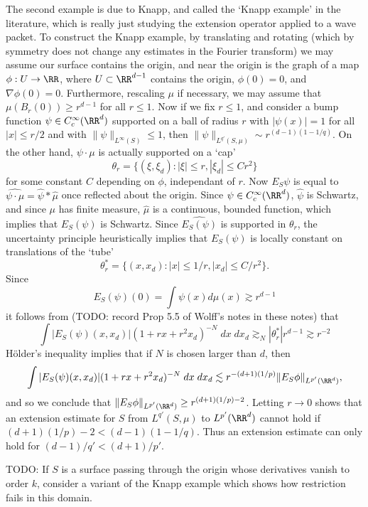 The second example is due to Knapp, and called the `Knapp example' in the literature, which is really just studying the extension operator applied to a wave packet. To construct the Knapp example, by translating and rotating (which by symmetry does not change any estimates in the Fourier transform) we may assume our surface contains the origin, and near the origin is the graph of a map $\phi: U \to \RR$, where $U \subset \RR^{d-1}$ contains the origin, $\phi(0) = 0$, and $\nabla \phi(0) = 0$. Furthermore, rescaling $\mu$ if necessary, we may assume that $\mu(B_r(0)) \geq r^{d-1}$ for all $r \leq 1$. Now if we fix $r \leq 1$, and consider a bump function $\psi \in C_c^\infty(\RR^d)$ supported on a ball of radius $r$ with $|\psi(x)| = 1$ for all $|x| \leq r/2$ and with $\| \psi \|_{L^\infty(S)} \leq 1$, then $\| \psi \|_{L^{q'}(S,\mu)} \sim r^{(d-1)(1 - 1/q)}$. On the other hand, $\psi \cdot \mu$ is actually supported on a `cap'
%
\[ \theta_r = \{ (\xi,\xi_d): |\xi| \leq r, |\xi_d| \leq C r^2 \} \]
%
for some constant $C$ depending on $\phi$, independant of $r$. Now $E_S \psi$ is equal to $\widehat{\psi \cdot \mu} = \widehat{\psi} * \widehat{\mu}$ once reflected about the origin. Since $\psi \in C_c^\infty(\RR^d)$, $\widehat{\psi}$ is Schwartz, and since $\mu$ has finite measure, $\widehat{\mu}$ is a continuous, bounded function, which implies that $E_S(\psi)$ is Schwartz. Since $\widehat{E_S(\psi)}$ is supported in $\theta_r$, the uncertainty principle heuristically implies that $E_S(\psi)$ is locally constant on translations of the `tube'
%
\[ \theta_r^* = \{ (x,x_d): |x| \leq 1/r, |x_d| \leq C/r^2 \}. \]
%
Since
%
\[ E_S(\psi)(0) = \int \psi(x) d\mu(x) \gtrsim r^{d-1} \]
%
it follows from (TODO: record Prop 5.5 of Wolff's notes in these notes) that
%
\[ \int |E_S(\psi)(x,x_d)| (1 + rx + r^2 x_d)^{-N}\; dx\; dx_d \gtrsim_N |\theta_r^*| r^{d-1} \gtrsim r^{-2} \]
%
H\"{o}lder's inequality implies that if $N$ is chosen larger than $d$, then
%
\begin{align*}
  \int |E_S(\psi)(x,x_d)| (1 + rx + r^2 x_d)^{-N}\; dx\; dx_d \lesssim r^{-(d+1)(1/p)} \| E_S \phi \|_{L^{p'}(\RR^d)},
\end{align*}
%
and so we conclude that $\| E_S \phi \|_{L^{p'}(\RR^d)} \geq r^{(d+1)(1/p) - 2}$. Letting $r \to 0$ shows that an extension estimate for $S$ from $L^{q'}(S,\mu)$ to $L^{p'}(\RR^d)$ cannot hold if $(d+1)(1/p) - 2 < (d-1)(1 - 1/q)$. Thus an extension estimate can only hold for $(d-1)/q' < (d+1)/p'$. 

\begin{remark}
  TODO: If $S$ is a surface passing through the origin whose derivatives vanish to order $k$, consider a variant of the Knapp example which shows how restriction fails in this domain.
\end{remark}

